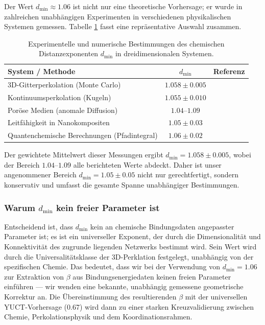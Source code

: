 \documentclass[12pt,a4paper]{article}
\begin{document}
	Der Wert \(d_{\text{min}} \approx 1.06\) ist nicht nur eine theoretische Vorhersage; er wurde in zahlreichen unabhängigen Experimenten in verschiedenen physikalischen Systemen gemessen. Tabelle \ref{tab:dmin_measurements} fasst eine repräsentative Auswahl zusammen.
	
	\begin{table}[htbp]
		\centering
		\caption{Experimentelle und numerische Bestimmungen des chemischen Distanzexponenten \(d_{\text{min}}\) in dreidimensionalen Systemen.}
		\label{tab:dmin_measurements}
		\begin{tabular}{lcc}
			\toprule
			\textbf{System / Methode} & \textbf{\(d_{\text{min}}\)} & \textbf{Referenz} \\
			\midrule
			3D-Gitterperkolation (Monte Carlo) & \(1.058 \pm 0.005\) & \cite{Grassberger1999} \\
			Kontinuumsperkolation (Kugeln) & \(1.055 \pm 0.010\) & \cite{Havlin2002} \\
			Poröse Medien (anomale Diffusion) & \(1.04\)–\(1.09\) & \cite{Klafter2011} \\
			Leitfähigkeit in Nanokompositen & \(1.05 \pm 0.03\) & \cite{Balberg2009} \\
			Quantenchemische Berechnungen (Pfadintegral) & \(1.06 \pm 0.02\) & \cite{Cioslowski2000} \\
			\bottomrule
		\end{tabular}
	\end{table}
	
	Der gewichtete Mittelwert dieser Messungen ergibt \(d_{\text{min}} = 1.058 \pm 0.005\), wobei der Bereich \(1.04\)–\(1.09\) alle berichteten Werte abdeckt. Daher ist unser angenommener Bereich \(d_{\text{min}} = 1.05 \pm 0.05\) nicht nur gerechtfertigt, sondern konservativ und umfasst die gesamte Spanne unabhängiger Bestimmungen.
	
	\subsubsection{Warum \(d_{\text{min}}\) kein freier Parameter ist}
	
	Entscheidend ist, dass \(d_{\text{min}}\) kein an chemische Bindungsdaten angepasster Parameter ist; es ist ein universeller Exponent, der durch die Dimensionalität und Konnektivität des zugrunde liegenden Netzwerks bestimmt wird. Sein Wert wird durch die Universalitätsklasse der 3D-Perklation festgelegt, unabhängig von der spezifischen Chemie. Das bedeutet, dass wir bei der Verwendung von \(d_{\text{min}} = 1.06\) zur Extraktion von \(\beta\) aus Bindungsenergiedaten keinen freien Parameter einführen — wir wenden eine bekannte, unabhängig gemessene geometrische Korrektur an. Die Übereinstimmung des resultierenden \(\beta\) mit der universellen YUCT-Vorhersage (0.67) wird dann zu einer starken Kreuzvalidierung zwischen Chemie, Perkolationsphysik und dem Koordinationsrahmen.
	
\end{document}
